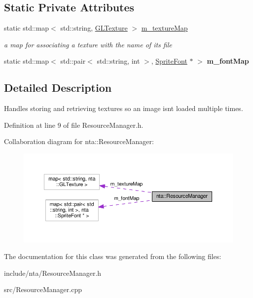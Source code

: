 \subsection*{Static Private Attributes}
\begin{DoxyCompactItemize}
\item 
\mbox{\label{classnta_1_1ResourceManager_abf9bb10402834f05b2673e0c1d8cb9aa}} 
static std\+::map$<$ std\+::string, \hyperlink{namespacenta_d3/dff/structnta_1_1GLTexture}{G\+L\+Texture} $>$ \hyperlink{classnta_1_1ResourceManager_abf9bb10402834f05b2673e0c1d8cb9aa}{m\+\_\+texture\+Map}
\begin{DoxyCompactList}\small\item\em a map for associating a texture with the name of its file \end{DoxyCompactList}\item 
\mbox{\label{classnta_1_1ResourceManager_ac6a87b69211ba52452b4c02847ea934e}} 
static std\+::map$<$ std\+::pair$<$ std\+::string, int $>$, \hyperlink{classnta_1_1SpriteFont}{Sprite\+Font} $\ast$ $>$ {\bfseries m\+\_\+font\+Map}
\end{DoxyCompactItemize}


\subsection{Detailed Description}
Handles storing and retrieving textures so an image isn\textquotesingle{}t loaded multiple times. 

Definition at line 9 of file Resource\+Manager.\+h.



Collaboration diagram for nta\+:\+:Resource\+Manager\+:
\nopagebreak
\begin{figure}[H]
\begin{center}
\leavevmode
\includegraphics[width=350pt]{d2/d39/classnta_1_1ResourceManager__coll__graph}
\end{center}
\end{figure}


The documentation for this class was generated from the following files\+:\begin{DoxyCompactItemize}
\item 
include/nta/Resource\+Manager.\+h\item 
src/Resource\+Manager.\+cpp\end{DoxyCompactItemize}
